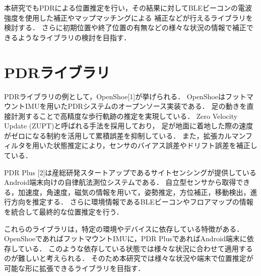 本研究でもPDRによる位置推定を行い，その結果に対してBLEビーコンの電波強度を使用した補正やマップマッチングによる
補正などが行えるライブラリを検討する．
さらに初期位置や終了位置の有無などの様々な状況の情報で補正できるようなライブラリの検討を目指す．



\section{PDRライブラリ}
PDRライブラリの例として，OpenShoe[1]が挙げられる．
OpenShoeはフットマウントIMUを用いたPDRシステムのオープンソース実装である．
足の動きを直接計測することで高精度な歩行軌跡の推定を実現している．
Zero Velocity Update (ZUPT)と呼ばれる手法を採用しており，
足が地面に着地した際の速度がゼロになる制約を活用して累積誤差を抑制している．
また，拡張カルマンフィルタを用いた状態推定により，センサのバイアス誤差やドリフト誤差を補正している．

PDR Plus [2]は産総研発スタートアップであるサイトセンシングが提供しているAndroid端末向けの自律航法測位システムである．
自立型センサから取得できる，加速度，角速度，磁気の情報を用いて，姿勢推定，方位補正，移動検出，進行方向を推定する．
さらに環境情報であるBLEビーコンやフロアマップの情報を統合して最終的な位置推定を行う．

これらのライブラリは，特定の環境やデバイスに依存している特徴がある．
OpenShoeであればフットマウントIMUに，PDR PlusであればAndroid端末に依存している．
このような依存している状態では様々な状況に合わせて適用するのが難しいと考えられる．
そのため本研究では様々な状況や端末で位置推定が可能な形に拡張できるライブラリを目指す．



